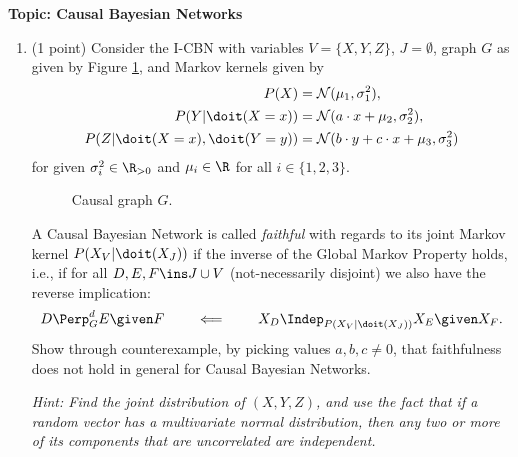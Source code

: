 

\flushleft\textbf{Topic: Causal Bayesian Networks}
\begin{enumerate}

\item (1 point) Consider the I-CBN with variables $V=\{X, Y, Z\}$, $J=\emptyset$, graph $G$ as given by Figure \ref{fig:one}, and Markov kernels given by
\begin{align*}
  P(X) &= \mathcal{N}(\mu_1, \sigma^2_1),\\
  P(Y|\doit(X=x)) &= \mathcal{N}(a\cdot x + \mu_2, \sigma^2_2),\\
  P(Z|\doit(X=x), \doit(Y=y)) &= \mathcal{N}(b\cdot y + c\cdot x + \mu_3, \sigma^2_3)
\end{align*}
for given $\sigma_i^2\in\R_{>0}$ and $\mu_i\in\R$ for all $i\in\{1, 2, 3\}$.

\begin{figure}[ht]
  \centering
  \caption{Causal graph $G$.}
  \label{fig:one}
\end{figure}

A Causal Bayesian Network is called \emph{faithful} with regards to its joint Markov kernel $P(X_V|\doit(X_J))$ if the inverse of the Global Markov Property holds, i.e., if for all $D, E, F \ins J \cup V$ (not-necessarily disjoint) we also have the reverse implication:
\[ D \Perp^d_G E \given F \qquad \impliedby \qquad X_D \Indep_{P(X_V|\doit(X_J))} X_E \given X_F. \]
Show through counterexample, by picking values $a, b, c \neq 0$, that faithfulness does not hold in general for Causal Bayesian Networks.

\emph{Hint: Find the joint distribution of $(X, Y, Z)$, and use the fact that if a random vector has a multivariate normal distribution, then any two or more of its components that are uncorrelated are independent.}


\end{enumerate}
